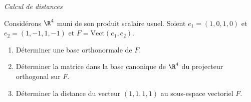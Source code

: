\documentclass[a4paper,10pt]{report}
\begin{document}
\medskip

\begin{center}
\textit{{ {\large Calcul de distances}}}
\end{center}

\medskip

\begin{Exa} Considérons $\R^4$ muni de son produit scalaire usuel. Soient $e_1=(1,0,1,0)$ et $e_2=(1,-1,1,-1)$ et $F=\textrm{Vect}(e_1,e_2)$.
\begin{enumerate}
    \item  D\'eterminer une base orthonormale de $F.$
    \item  D\'eterminer la matrice dans la base canonique de $\R^4$ du projecteur orthogonal
sur $F.$
    \item  D\'eterminer la distance du vecteur $(1,1,1,1)$ au sous-espace vectoriel  $F.$
\end{enumerate}
\end{Exa}
\end{document}
